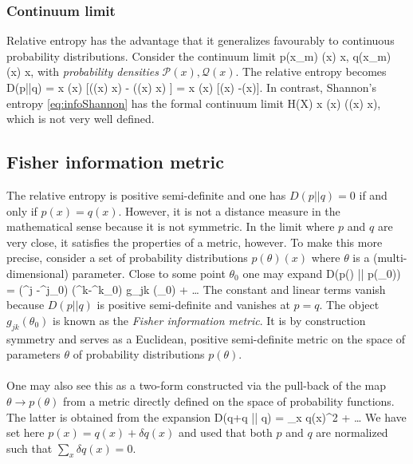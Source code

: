 \subsubsection{Continuum limit}
\label{subsubsec:infoContinuumRelEntropy}
Relative entropy has the advantage that it generalizes favourably to continuous probability distributions. Consider the continuum limit
\bse 
p(x_m) \rightarrow {}(x) \md x, \quad q(x_m) \rightarrow {}(x) \md x,
\ese  
with \emph{probability densities} $\mathcal{P}(x), \mathcal{Q}(x)$. The relative entropy becomes
\be 
D(p||q) = \int \md x (x) [\ln((x) \md x) - \ln ((x) \md x) ] = \int \md x (x) [\ln{}(x) -\ln {}(x)].
\ee 
In contrast, Shannon's entropy \ref{eq:infoShannon} has the formal continuum limit
\be 
H(X) \rightarrow \int \md x (x) \ln ((x) \md x),
\ee 
which is not very well defined.

\subsection{Fisher information metric}
\label{subsec:infoFisherInfoMetric}
The relative entropy is positive semi-definite and one has $D(p||q)=0$ if and only if $p(x) =q(x)$. However, it is not a distance measure in the mathematical sense because it is not symmetric. In the limit where $p$ and $q$ are very close, it satisfies the properties of a metric, however. To make this more precise, consider a set of probability distributions $p(\theta)(x)$ where $\theta$ is a (multi-dimensional) parameter. Close to some point $\theta_0$ one may expand
\bse 
D(p(\theta) || p(\theta_0)) = \half (\theta^j -\theta^j_0) (\theta^k-\theta^k_0) g_{jk} (\theta_0) + \dots 
\ese 
The constant and linear terms vanish because $D(p||q)$ is positive semi-definite and vanishes at $p=q$. The object $g_{jk}(\theta_0)$ is known as the \emph{Fisher information metric}. It is by construction symmetry and serves as a Euclidean, positive semi-definite metric on the space of parameters $\theta$ of probability distributions $p(\theta)$.\\
\\
One may also see this as a two-form constructed via the pull-back of the map $\theta \rightarrow p(\theta)$ from a metric directly defined on the space of probability functions. The latter is obtained from the expansion
\bse 
D(q+\delta q || q) = \sum_x  \delta q(x)^2 + \dots 
\ese 
We have set here $p(x)=q(x)+\delta q(x)$ and used that both $p$ and $q$ are normalized such that $\sum_x \delta q(x) =0$.











